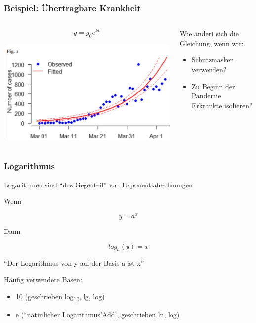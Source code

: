 \documentclass{beamer}
\begin{document}
\begin{frame}
\frametitle{Beispiel: Übertragbare Krankheit}

\begin{columns}[c]
\begin{column}{5cm}

\[
y = y_0 e^{kt}
\] 


\begin{center}

\includegraphics[width=\textwidth]{Covid19_Africa.png}
\end{center}



\end{column}
\begin{column}{5cm}

Wie ändert sich die Gleichung, wenn wir:

\begin{itemize}
\item
Schutzmasken verwenden? 
\item
Zu Beginn der Pandemie Erkrankte isolieren?
\end{itemize}


\end{column}
\end{columns}


\end{frame}



\begin{frame}
\frametitle{Logarithmus}

Logarithmen sind ``das Gegenteil'' von Exponentialrechnungen

Wenn 

\[
y = a^x
\]

Dann

\[
log_a(y) = x
\]


``Der Logarithmus von y auf der Basis a ist x'' 


\pause

Häufig verwendete Basen: 

\begin{itemize}
\item
10 (geschrieben log\textsubscript{10}, lg, log)
\item
e (``natürlicher Logarithmus'Add', geschrieben ln, log)
\end{itemize}

\end{frame}
\end{document}
